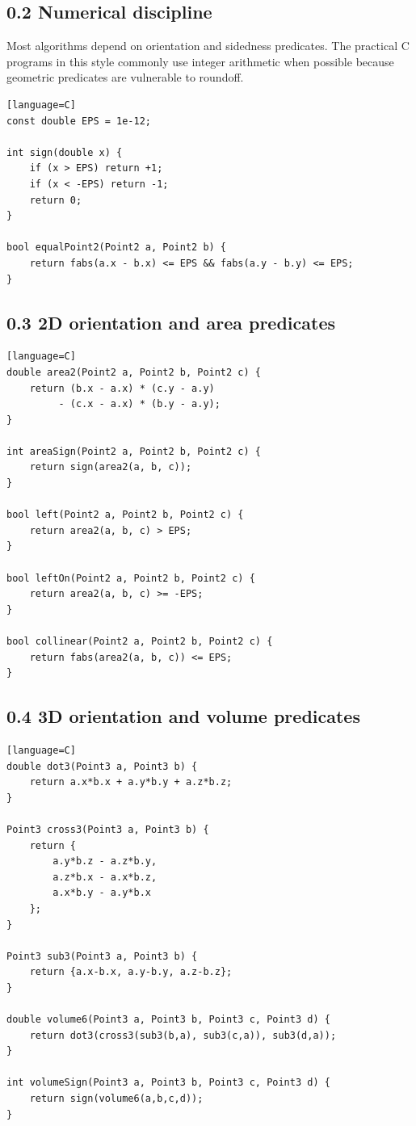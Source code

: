 \documentclass[11pt]{article}
\begin{document}
\subsection{0.2 Numerical discipline}\label{numerical-discipline}

Most algorithms depend on orientation and sidedness predicates. The
practical C programs in this style commonly use integer arithmetic when
possible because geometric predicates are vulnerable to roundoff.

\begin{verbatim}[language=C]
const double EPS = 1e-12;

int sign(double x) {
    if (x > EPS) return +1;
    if (x < -EPS) return -1;
    return 0;
}

bool equalPoint2(Point2 a, Point2 b) {
    return fabs(a.x - b.x) <= EPS && fabs(a.y - b.y) <= EPS;
}
\end{verbatim}

\subsection{0.3 2D orientation and area
predicates}\label{d-orientation-and-area-predicates}

\begin{verbatim}[language=C]
double area2(Point2 a, Point2 b, Point2 c) {
    return (b.x - a.x) * (c.y - a.y)
         - (c.x - a.x) * (b.y - a.y);
}

int areaSign(Point2 a, Point2 b, Point2 c) {
    return sign(area2(a, b, c));
}

bool left(Point2 a, Point2 b, Point2 c) {
    return area2(a, b, c) > EPS;
}

bool leftOn(Point2 a, Point2 b, Point2 c) {
    return area2(a, b, c) >= -EPS;
}

bool collinear(Point2 a, Point2 b, Point2 c) {
    return fabs(area2(a, b, c)) <= EPS;
}
\end{verbatim}

\subsection{0.4 3D orientation and volume
predicates}\label{d-orientation-and-volume-predicates}

\begin{verbatim}[language=C]
double dot3(Point3 a, Point3 b) {
    return a.x*b.x + a.y*b.y + a.z*b.z;
}

Point3 cross3(Point3 a, Point3 b) {
    return {
        a.y*b.z - a.z*b.y,
        a.z*b.x - a.x*b.z,
        a.x*b.y - a.y*b.x
    };
}

Point3 sub3(Point3 a, Point3 b) {
    return {a.x-b.x, a.y-b.y, a.z-b.z};
}

double volume6(Point3 a, Point3 b, Point3 c, Point3 d) {
    return dot3(cross3(sub3(b,a), sub3(c,a)), sub3(d,a));
}

int volumeSign(Point3 a, Point3 b, Point3 c, Point3 d) {
    return sign(volume6(a,b,c,d));
}
\end{verbatim}
\end{document}

